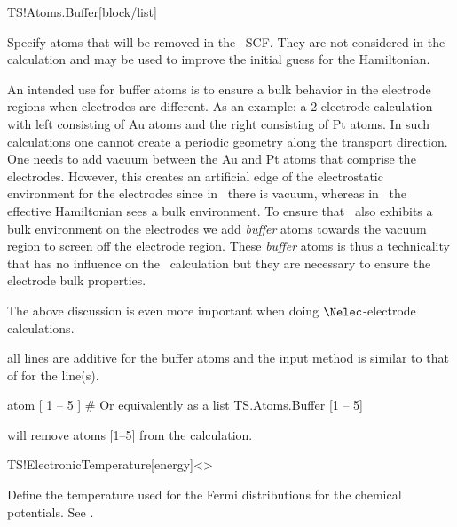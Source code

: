 \begin{fdfentry}{TS!Atoms.Buffer}[block/list]

  Specify atoms that will be removed in the \tsiesta\ SCF. They are
  not considered in the calculation and may be used to improve the
  initial guess for the Hamiltonian.


  An intended use for buffer atoms is to ensure a bulk behavior in the
  electrode regions when electrodes are different. As an example: a 2
  electrode calculation with left consisting of Au atoms and the right
  consisting of Pt atoms. In such calculations one cannot create a
  periodic geometry along the transport direction. One needs to add
  vacuum between the Au and Pt atoms that comprise the
  electrodes. However, this creates an artificial edge of the
  electrostatic environment for the electrodes since in \siesta\ there
  is vacuum, whereas in \tsiesta\ the effective Hamiltonian sees a
  bulk environment. To ensure that \siesta\ also exhibits a bulk
  environment on the electrodes we add \emph{buffer} atoms towards the
  vacuum region to screen off the electrode region. These
  \emph{buffer} atoms is thus a technicality that has no influence on
  the \tsiesta\ calculation but they are necessary to ensure the
  electrode bulk properties.

  The above discussion is even more important when doing $\Nelec$-electrode
  calculations.
  
  \note all lines are additive for the buffer atoms and the input
  method is similar to that of  for the
   line(s).

  \begin{fdfexample}
       atom [ 1 -- 5 ]
    # Or equivalently as a list   
    TS.Atoms.Buffer [1 -- 5]
  \end{fdfexample}
  will remove atoms [1--5] from the calculation.

\end{fdfentry}

\begin{fdfentry}{TS!ElectronicTemperature}[energy]<>

  Define the temperature used for the Fermi distributions for the
  chemical potentials. 
  See .

\end{fdfentry}

